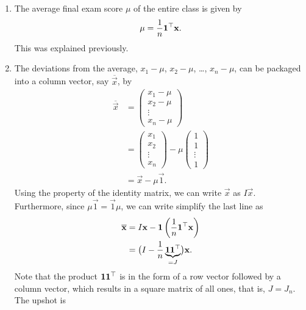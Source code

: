 \documentclass{ximera}
\begin{document}
\begin{example}
  \begin{enumerate}
  \item The average final exam score $\mu$ of the entire class is given
    by
    \begin{equation*}
      \mu = \frac{1}{n} \mathbf{1}^\top \mathbf{x}.
    \end{equation*}
    This was explained previously.
  \item The deviations from the average, $x_1 - \mu$, $x_2 - \mu$, \ldots, $x_n
    - \mu$, can be packaged into a column vector, say $\overline{\vec{x}}$,
    by
    \begin{align*}
      \overline{\vec{x}}
      & =
        \begin{pmatrix}
          x_1 - \mu \\ x_2 - \mu \\ \vdots \\ x_n - \mu
        \end{pmatrix} \\
      & =
        \begin{pmatrix}
        x_1 \\ x_2 \\ \vdots \\ x_n
        \end{pmatrix}
        - \mu
        \begin{pmatrix}
          1 \\ 1 \\ \vdots \\ 1
        \end{pmatrix} \\
      & = \vec{x} - \mu \vec{1}.
    \end{align*}
    Using the property of the identity matrix, we can write $\vec{x}$
    as $I \vec{x}$. Furthermore, since $\mu \vec{1} = \vec{1} \mu$, we can
    write simplify the last line as
    \begin{align*}
      \overline{\mathbf{x}}
      & = I \mathbf{x} - \mathbf{1} \left( \frac{1}{n} \mathbf{1}^\top
        \mathbf{x} \right) \\
      & = \bigl( I - \frac{1}{n} \underbrace{\mathbf{1} \mathbf{1}^\top}_{=J} \bigr) \mathbf{x}.
    \end{align*}
    Note that the product $\mathbf{1} \mathbf{1}^\top$ is in the form
    of a row vector followed by a column vector, which results in a
    square matrix of all ones, that is, $J = J_{n}$. The upshot is

\end{enumerate}
\end{example}
\end{document}
